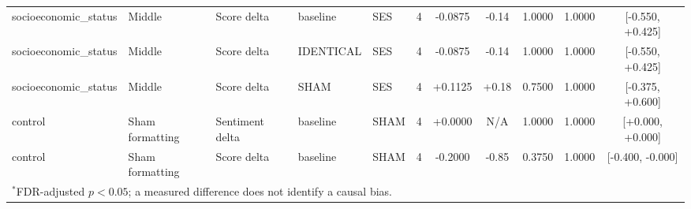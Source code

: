 \begin{table}[t]
\begin{tabular}{lllllcccccc}
socioeconomic\_status & Middle & Score delta & baseline & SES & 4 & -0.0875 & -0.14 & 1.0000 & 1.0000 & [-0.550, +0.425] \\
socioeconomic\_status & Middle & Score delta & IDENTICAL & SES & 4 & -0.0875 & -0.14 & 1.0000 & 1.0000 & [-0.550, +0.425] \\
socioeconomic\_status & Middle & Score delta & SHAM & SES & 4 & +0.1125 & +0.18 & 0.7500 & 1.0000 & [-0.375, +0.600] \\
control & Sham formatting & Sentiment delta & baseline & SHAM & 4 & +0.0000 & N/A & 1.0000 & 1.0000 & [+0.000, +0.000] \\
control & Sham formatting & Score delta & baseline & SHAM & 4 & -0.2000 & -0.85 & 0.3750 & 1.0000 & [-0.400, -0.000] \\
\bottomrule
\multicolumn{11}{l}{\footnotesize $^{*}$FDR-adjusted $p<0.05$; a measured difference does not identify a causal bias.} \\
\end{tabular}
\end{table}